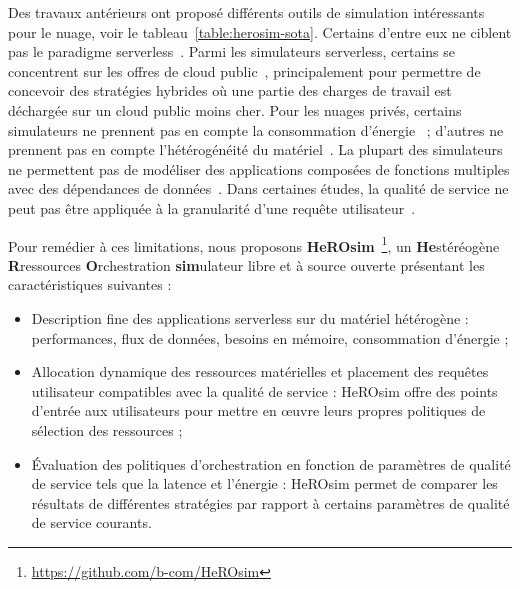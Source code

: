 Des travaux antérieurs ont proposé différents outils de simulation intéressants pour le nuage, voir le tableau~\ref{table:herosim-sota}. Certains d'entre eux ne ciblent pas le paradigme serverless~\cite{calheiros_cloudsim_2011, wickremasinghe_cloudanalyst_2010, cai_elasticsim_2017, buyyaGridSimToolkitModeling2002, nunez_icancloud_2012, mahmudIFogSim2ExtendedIFogSim2021}. Parmi les simulateurs serverless, certains se concentrent sur les offres de cloud public~\cite{nunez_icancloud_2012, mahmoudiSimFaaSPerformanceSimulator2021}, principalement pour permettre de concevoir des stratégies hybrides où une partie des charges de travail est déchargée sur un cloud public moins cher. Pour les nuages privés, certains simulateurs ne prennent pas en compte la consommation d'énergie~\cite{jeonCloudSimExtensionSimulatingDistributed2019, cai_elasticsim_2017, buyyaGridSimToolkitModeling2002, nunez_icancloud_2012} ; d'autres ne prennent pas en compte l'hétérogénéité du matériel~\cite{jeonCloudSimExtensionSimulatingDistributed2019, nunez_icancloud_2012, mahmoudiSimFaaSPerformanceSimulator2021}. La plupart des simulateurs ne permettent pas de modéliser des applications composées de fonctions multiples avec des dépendances de données~\cite{calheiros_cloudsim_2011, mampage_cloudsimsc_2023, wickremasinghe_cloudanalyst_2010, jeonCloudSimExtensionSimulatingDistributed2019, buyyaGridSimToolkitModeling2002, nunez_icancloud_2012, mahmudIFogSim2ExtendedIFogSim2021}. Dans certaines études, la qualité de service ne peut pas être appliquée à la granularité d'une requête utilisateur~\cite{calheiros_cloudsim_2011, mampage_cloudsimsc_2023, wickremasinghe_cloudanalyst_2010, cai_elasticsim_2017, nunez_icancloud_2012, mahmudIFogSim2ExtendedIFogSim2021, mastenbroekOpenDCConvenientModeling2021, mahmoudiSimFaaSPerformanceSimulator2021}.

Pour remédier à ces limitations, nous proposons \textbf{HeROsim}~\footnote{\href{https://github.com/b-com/HeROsim}{https://github.com/b-com/HeROsim}}, un \textbf{He}stéréogène \textbf{R}ressources \textbf{O}rchestration \textbf{sim}ulateur libre et à source ouverte présentant les caractéristiques suivantes :

\begin{itemize}
    \item Description fine des applications serverless sur du matériel hétérogène : performances, flux de données, besoins en mémoire, consommation d'énergie ;
    \item Allocation dynamique des ressources matérielles et placement des requêtes utilisateur compatibles avec la qualité de service : HeROsim offre des points d'entrée aux utilisateurs pour mettre en œuvre leurs propres politiques de sélection des ressources ;
    \item Évaluation des politiques d'orchestration en fonction de paramètres de qualité de service tels que la latence et l'énergie : HeROsim permet de comparer les résultats de différentes stratégies par rapport à certains paramètres de qualité de service courants.
\end{itemize}

